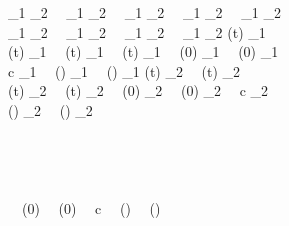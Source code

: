 \begin{figure}[p]
\begin{center}
\begin{sllisting}
  \hspace{0.5em}\text{--}\hspace{0.4em}{\cavintmax}_1 \le {\cavintmax}_2 \, \land \, {\cavintmin}_1 \ge {\cavintmin}_2 \, \land \, {\cahintmax}_1 \le {\cahintmax}_2 \, \land \, {\cahintmin}_1 \ge {\cahintmin}_2 \, \land \, {\cahzerointmax}_1 \le {\cahzerointmax}_2 \, \land \, \\
  \slind {\cahzerointmin}_1 \ge {\cahzerointmin}_2 \, \land \, {\cacmin}_1 \ge {\cacmin}_2 \, \land \, {\cahmintmax}_1 \le {\cahmintmax}_2 \, \land \, {\cahmintmin}_1 \ge {\cahmintmin}_2 \limply \cavint(t) \le {\cavintmax}_1 \, \land \, \\
  \slind \cavint(t) \ge {\cavintmin}_1 \, \land \, \cahint(t) \le {\cahintmax}_1 \, \land \, \cahint(t) \ge {\cahintmin}_1 \, \land \, \cahint(0) \le {\cahzerointmax}_1 \, \land \, \cahint(0) \ge {\cahzerointmin}_1 \, \land \, \\
  \slind c \ge {\cacmin}_1 \, \land \, \cahint(\catm) \le {\cahmintmax}_1 \, \land \, \cahint(\catm) \ge {\cahmintmin}_1 \limply \cavint(t) \le {\cavintmax}_2 \, \land \, \cavint(t) \ge {\cavintmin}_2 \, \land \, \\
  \slind \cahint(t) \le {\cahintmax}_2 \, \land \, \cahint(t) \ge {\cahintmin}_2 \, \land \, \cahint(0) \le {\cahzerointmax}_2 \, \land \, \cahint(0) \ge {\cahzerointmin}_2 \, \land \, c \ge {\cacmin}_2 \, \land \, \\
  \slind \cahint(\catm) \le {\cahmintmax}_2 \, \land \, \cahint(\catm) \ge {\cahmintmin}_2\\
\pbmodel\\
  \hspace{0.5em}\text{--}\hspace{0.4em}\color{red}{\Init \, \land \, \cavint(t) \le \cavintmax \, \land \, \cavint(t) \ge \cavintmin \, \land \, \cahint(t) \le \cahintmax \, \land \, \cahint(t) \ge \cahintmin \, \land \, \cahint(0) \le \cahzerointmax \, \land \,} \\
  \slind {}\\
\pbsafe\\
  \hspace{0.5em}\text{--}\hspace{0.4em}\Init \, \land \, \cahint(0) \le \cahzerointmax \, \land \, \cahint(0) \ge \cahzerointmin \, \land \, c \ge \cacmin \, \land \, \cahint(\catm) \le \cahmintmax \, \land \, \cahint(\catm) \ge \cahmintmin \, \land \, \Inv \\

\end{sllisting}
\end{center}
\end{figure}
